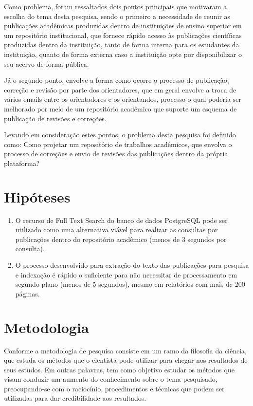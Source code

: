 Como problema, foram ressaltados dois pontos principais que motivaram a escolha do tema desta pesquisa, sendo o primeiro a necessidade de reunir as publicações acadêmicas produzidas dentro de instituições de ensino superior em um repositório institucional, que fornece rápido acesso às publicações científicas produzidas dentro da instituição, tanto de forma interna para os estudantes da instituição, quanto de forma externa caso a instituição opte por disponibilizar o seu acervo de forma pública.

Já o segundo ponto, envolve a forma como ocorre o processo de publicação, correção e revisão por parte dos orientadores, que em geral envolve a troca de vários emails entre os orientadores e os orientandos, processo o qual poderia ser melhorado por meio de um repositório acadêmico que suporte um esquema de publicação de revisões e correções.

Levando em consideração estes pontos, o problema desta pesquisa foi definido como: Como projetar um repositório de trabalhos acadêmicos, que envolva o processo de correções e envio de revisões das publicações dentro da própria plataforma?


\section{Hipóteses} \label{sec::Hypothesis}
\begin{enumerate}
    \item O recurso de Full Text Search do banco de dados PostgreSQL pode ser utilizado como uma alternativa viável para realizar as consultas por publicações dentro do repositório acadêmico (menos de 3 segundos por consulta).
    \item O processo desenvolvido para extração do texto das publicações para pesquisa e indexação é rápido o suficiente para não necessitar de processamento em segundo plano (menos de 5 segundos), mesmo em relatórios com mais de 200 páginas.
\end{enumerate}


\section{Metodologia} \label{sec:Methodology}

Conforme \citep[p. 15]{LOVATO:metodologia} a metodologia de pesquisa
consiste em um ramo da filosofia da ciência, que estuda os métodos que
o cientista pode utilizar para chegar nos resultados de seus estudos.
Em outras palavras, tem como objetivo estudar os métodos que visam
conduzir um aumento do conhecimento sobre o tema pesquisado, preocupando-se
com o raciocínio, procedimentos e técnicas que podem ser utilizadas para
dar credibilidade aos resultados.

